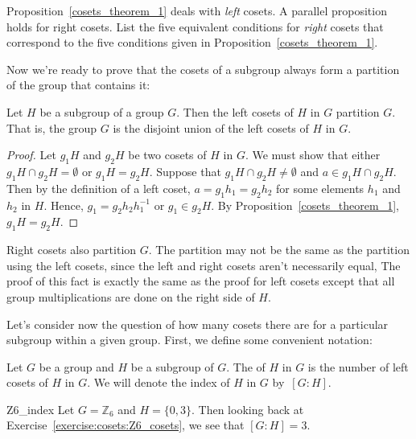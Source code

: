 \begin{exercise}{}
Proposition~\ref{cosets_theorem_1} deals with \emph{left} cosets. A parallel proposition holds for right cosets. List the five equivalent conditions for \emph{right} cosets that correspond to the five conditions given in Proposition~\ref{cosets_theorem_1}.
\end{exercise}

Now we're ready to prove that the cosets of a subgroup always form a partition of the group that contains it:

\begin{thm}\label{cosets_theorem_2}
Let $H$ be a subgroup of a group $G$.  Then the left cosets of $H$ in $G$ partition $G$.  That is, the group $G$ is the disjoint union of the left cosets of $H$ in $G$. 
\end{thm}

\begin{proof}
Let $g_1 H$ and $g_2 H$ be two cosets of $H$ in $G$.  We must show that either $g_1 H \cap g_2 H = \emptyset$ or $g_1 H = g_2 H$.  Suppose that $g_1 H \cap g_2 H \neq \emptyset$ and $a \in g_1 H \cap g_2 H$.  Then by the definition of a left coset, $a = g_1 h_1 = g_2 h_2$ for some elements $h_1$ and $h_2$ in $H$.  Hence, $g_1 = g_2 h_2 h_1^{-1}$ or $g_1 \in g_2 H$.  By Proposition~\ref{cosets_theorem_1}, $g_1 H = g_2 H$. 
\end{proof}

\begin{rem}\label{right_is_left}
Right cosets also partition $G$. The partition may not be the same as the partition using the left cosets, since the left and right cosets aren't necessarily equal, 
The proof of this fact is exactly the same as the proof for left cosets except that all group multiplications are done on the right side of $H$.
\end{rem} 

Let's consider now the question of how many cosets there are for a particular subgroup within a given group. First, we define some convenient notation:

\begin{defn}\label{cosets_index}
Let $G$ be a group and $H$ be a subgroup of $G$.  The  of $H$ in $G$ is the number of left cosets of $H$ in $G$.  We will denote the index of $H$ in $G$  by~$[G:H]$\label{indexofasubgroup}.
\end{defn}  

\begin{example}{Z6_index}
Let $G= {\mathbb Z}_6$ and $H = \{ 0, 3 \}$. Then looking back at Exercise~\ref{exercise:cosets:Z6_cosets}, we see that $[G:H] = 3$.
\end{example}

